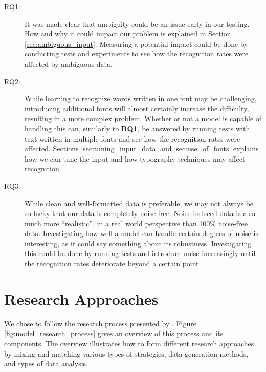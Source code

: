 \begin{description}
    \item[RQ1:]{It was made clear that ambiguity could be an issue early in our testing. How and why it could impact our problem is explained in Section \ref{sec:ambiguous_input}. Measuring a potential impact could be done by conducting tests and experiments to see how the recognition rates were affected by ambiguous data.}
    \item[RQ2:]{While learning to recognize words written in one font may be challenging, introducing additional fonts will almost certainly increase the difficulty, resulting in a more complex problem. Whether or not a model is capable of handling this can, similarly to \textbf{RQ1}, be answered by running tests with text written in multiple fonts and see how the recognition rates were affected. Sections \ref{sec:tuning_input_data} and \ref{sec:use_of_fonts} explains how we can tune the input and how typography techniques may affect recognition.}
    \item[RQ3:]{While clean and well-formatted data is preferable, we may not always be so lucky that our data is completely noise free. Noise-induced data is also much more ``realistic'', in a real world perspective than 100\% noise-free data. Investigating how well a model can handle certain degrees of noise is interesting, as it could say something about its robustness. Investigating this could be done by running tests and introduce noise increasingly until the recognition rates deteriorate beyond a certain point.}
\end{description}


\section{Research Approaches}
\label{sec:research_approaches}
We chose to follow the research process presented by \cite{oates2005researching}. Figure \ref{fig:model_research_process} gives an overview of this process and its components. The overview illustrates how to form different research approaches by mixing and matching various types of strategies, data generation methods, and types of data analysis.

